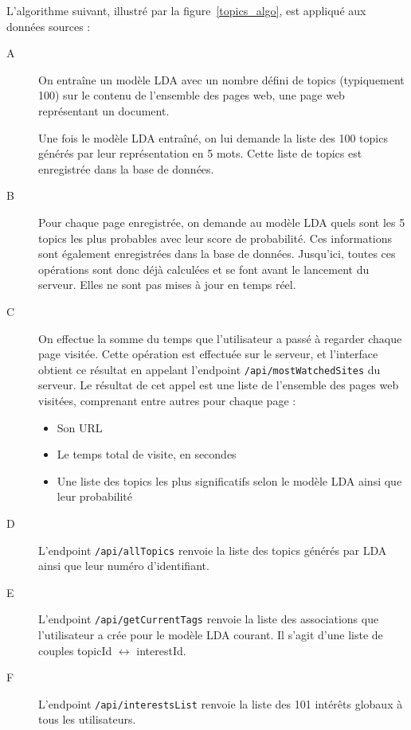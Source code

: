 			L'algorithme suivant, illustré par la figure~\ref{topics_algo}, est appliqué aux données sources :
			\begin{description}
				\item[A] On entraîne un modèle LDA avec un nombre défini de topics (typiquement 100) sur le contenu de l'ensemble des pages web, une page web représentant un document.
				
				Une fois le modèle LDA entraîné, on lui demande la liste des 100 topics générés par leur représentation en 5 mots. Cette liste de topics est enregistrée dans la base de données.

				\item[B] Pour chaque page enregistrée, on demande au modèle LDA quels sont les 5 topics les plus probables avec leur score de probabilité. Ces informations sont également enregistrées dans la base de données. Jusqu'ici, toutes ces opérations sont donc déjà calculées et se font avant le lancement du serveur. Elles ne sont pas mises à jour en temps réel.
				
				\item[C] On effectue la somme du temps que l'utilisateur a passé à regarder chaque page visitée. Cette opération est effectuée sur le serveur, et l'interface obtient ce résultat en appelant l'endpoint \texttt{/api/mostWatchedSites} du serveur. Le résultat de cet appel est une liste de l'ensemble des pages web visitées, comprenant entre autres pour chaque page : 
				\begin{itemize}
					\item Son URL
					\item Le temps total de visite, en secondes
					\item Une liste des topics les plus significatifs selon le modèle LDA ainsi que leur probabilité
				\end{itemize}

				\item[D] L'endpoint \texttt{/api/allTopics} renvoie la liste des topics générés par LDA ainsi que leur numéro d'identifiant.

				\item[E] L'endpoint \texttt{/api/getCurrentTags} renvoie la liste des associations que l'utilisateur a crée pour le modèle LDA courant. Il s'agit d'une liste de couples topicId $\longleftrightarrow$ interestId.

				\item[F] L'endpoint \texttt{/api/interestsList} renvoie la liste des 101 intérêts globaux à tous les utilisateurs.


\end{description}
